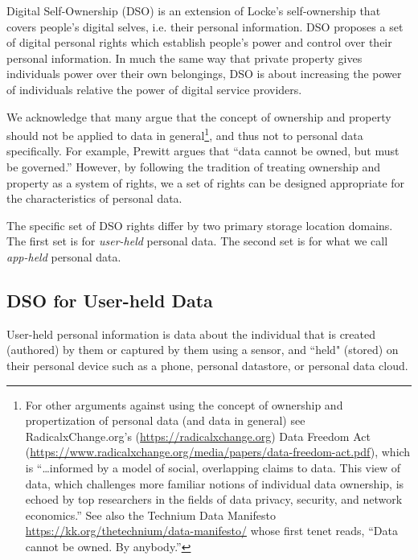 \documentclass[11pt, oneside]{article}   	%
\begin{document}
Digital Self-Ownership (DSO) is an extension of Locke's self-ownership that covers people's digital selves, i.e. their personal information. DSO proposes a set of digital personal rights which establish people's power and control over their personal information. In much the same way that private property gives individuals power over their own belongings, DSO is about increasing the power of individuals relative the power of digital service providers. 

We acknowledge that many argue that the concept of ownership and property should not be applied to data in general\footnote{For other arguments against using the concept of ownership and propertization of personal data (and data in general) see RadicalxChange.org's (\url{https://radicalxchange.org}) Data Freedom Act (\url{https://www.radicalxchange.org/media/papers/data-freedom-act.pdf}), which is “…informed by a model of social, overlapping claims to data. This view of data, which challenges more familiar notions of individual data ownership, is echoed by top researchers in the fields of data privacy, security, and network economics.” See also the Technium Data Manifesto \url{https://kk.org/thetechnium/data-manifesto/} whose first tenet reads, “Data cannot be owned. By anybody.”}, and thus not to personal data specifically. For example, Prewitt\cite{Prewitt2021} argues that “data cannot be owned, but must be governed.”  However, by following the tradition of treating ownership and property as a system of rights, we a set of rights can be designed appropriate for the characteristics of personal data.  

The specific set of DSO rights differ by two primary storage location domains. The first set is for \emph{user-held}\cite{Jurcys2021} personal data. The second set is for what we call \emph{app-held} personal data. 

\subsection{DSO for User-held Data}

User-held personal information is data about the individual that is created (authored) by them or captured by them using a sensor, and ``held"  (stored) on their personal device such as a phone, personal datastore, or personal data cloud. 
\end{document}
